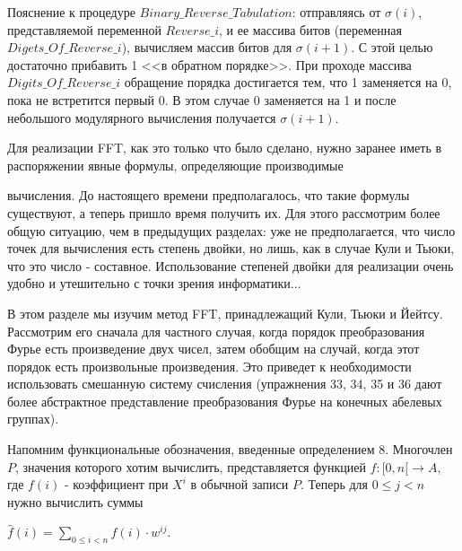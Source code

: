 \documentclass{mai_book}
\begin{document}
	Пояснение к процедуре $Binary \_ Reverse \_ Tabulation$: отправляясь от $\sigma(i)$, представляемой переменной $Reverse \_ i$, и ее массива битов (переменная $Digets \_ Of \_ Reverse \_ i$), вычисляем массив битов для $\sigma(i+1)$. С этой целью достаточно прибавить  1 <<в обратном порядке>>. При проходе массива $Digits \_ Of \_ Reverse \_ i$ обращение порядка достигается тем, что 1 заменяется на 0, пока не встретится первый 0. В этом случае 0 заменяется на 1 и после небольшого модулярного вычисления получается $\sigma(i+1)$.
	
	\bigskip
	
	
	\medskip
	
	\noindent Для реализации FFT, как это только что было сделано, нужно заранее иметь в распоряжении явные формулы, определяющие производимые
	
	\newpage
	
	
	
	\noindent вычисления. До настоящего времени предполагалось, что такие формулы существуют, а теперь пришло время получить их. Для этого рассмотрим более общую ситуацию, чем в предыдущих разделах: уже не предполагается, что число точек для вычисления есть степень двойки, но лишь, как в случае Кули и Тьюки, что это число - составное. Использование степеней двойки для реализации очень удобно и утешительно с точки зрения информатики...
	
	В этом разделе мы изучим метод FFT, принадлежащий Кули, Тьюки и Йейтсу. Рассмотрим его сначала для частного случая, когда порядок преобразования Фурье есть произведение двух чисел, затем обобщим на случай, когда этот порядок есть произвольные произведения. Это приведет к необходимости использовать смешанную систему счисления (упражнения 33, 34, 35 и 36 дают более абстрактное представление преобразования Фурье на конечных абелевых группах).
	
	\bigskip
	
	
	\medskip
	
	\noindent Напомним функциональные обозначения, введенные определением 8. Многочлен $P$, значения которого хотим вычислить, представляется функцией $f : [0,n[ \rightarrow A$, где $f(i)$ - коэффициент при $X^i$ в обычной записи $P$. Теперь для $0 \leq j < n$ нужно вычислить суммы
	\begin{center}
		$\hat f (i) =\sum_{0 \leq i < n} f(i) \cdot w^{ij}$.
	\end{center}
	
\end{document}

